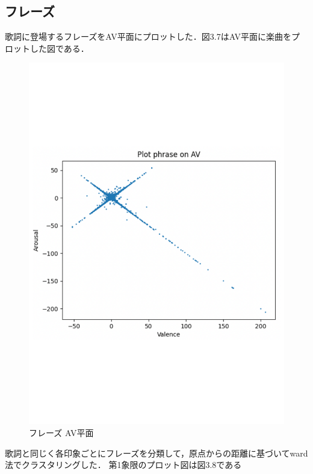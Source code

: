 \subsection{フレーズ}
歌詞に登場するフレーズをAV平面にプロットした．図3.7はAV平面に楽曲をプロットした図である．
\begin{figure}[H]
    \centering
    \includegraphics[width=12cm]{phrase_AV.pdf}
    \vspace{0mm}
    \caption{フレーズ AV平面}
    \label{fig:mms}
    \vspace{5mm}
\end{figure}
歌詞と同じく各印象ごとにフレーズを分類して，原点からの距離に基づいてward法でクラスタリングした．
\newpage
第1象限のプロット図は図3.8である
